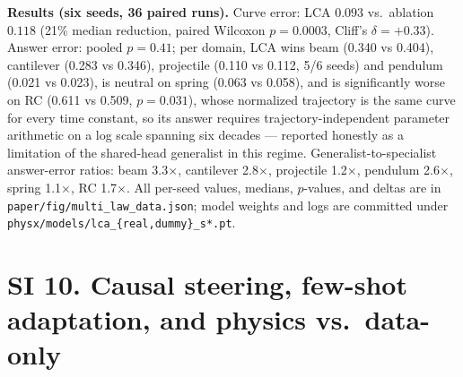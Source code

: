 \documentclass[11pt,a4paper]{article}
\begin{document}
\textbf{Results (six seeds, 36 paired runs).} Curve error: LCA $0.093$
vs.\ ablation $0.118$ (21\% median reduction, paired Wilcoxon
$p=0.0003$, Cliff's $\delta=+0.33$). Answer error: pooled $p=0.41$; per
domain, LCA wins beam (0.340 vs 0.404), cantilever (0.283 vs 0.346),
projectile (0.110 vs 0.112, 5/6 seeds) and pendulum (0.021 vs 0.023), is
neutral on spring (0.063 vs 0.058), and is significantly worse on RC
(0.611 vs 0.509, $p=0.031$), whose normalized trajectory is the same curve
for every time constant, so its answer requires trajectory-independent
parameter arithmetic on a log scale spanning six decades --- reported
honestly as a limitation of the shared-head generalist in this regime.
Generalist-to-specialist answer-error ratios: beam 3.3$\times$,
cantilever 2.8$\times$, projectile 1.2$\times$, pendulum 2.6$\times$,
spring 1.1$\times$, RC 1.7$\times$. All per-seed values, medians,
$p$-values, and deltas are in
\texttt{paper/fig/multi\_law\_data.json}; model weights and logs are
committed under \texttt{physx/models/lca\_\{real,dummy\}\_s*.pt}.

\section*{SI 10. Causal steering, few-shot adaptation, and physics vs.\ data-only}
\end{document}
